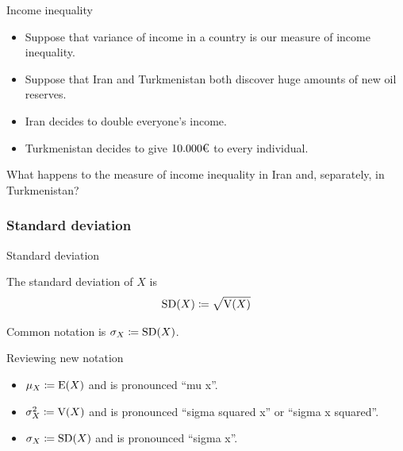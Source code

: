 \documentclass[english,notheorems]{beamer}\usepackage[]{graphicx}\usepackage[]{xcolor}
\newcommand{\omFinalAnswer}[1]{\textcolor<.>{orange} {#1}}
\theoremstyle{definition}
\theoremstyle{plain}
\theoremstyle{remark}
\begin{document}
\begin{frame}{Income inequality}
\begin{itemize}
\item Suppose that variance of income in a country is our measure of income
inequality.
\item Suppose that Iran and Turkmenistan both discover huge amounts of new
oil reserves.
\item Iran decides to double everyone's income.
\item Turkmenistan decides to give $\currency{10\thousandsSeparator000}$
to every individual.
\end{itemize}
\begin{omx}
What happens to the measure of income inequality in Iran and, separately,
in Turkmenistan?
\end{omx}
\end{frame}

\subsubsection{Standard deviation}
\begin{frame}{Standard deviation}
\begin{block}{}
The standard deviation of $X$ is
\[
\omSD(X)\omcoloneqq\sqrt{\omV(X)}
\]
\end{block}
\begin{block}{}
Common notation is $\sigma_{X}\omcoloneqq\omSD(X)$.
\end{block}
\end{frame}
\begin{frame}{Reviewing new notation}
\begin{itemize}
\item $\mu_{X}\omcoloneqq\omE(X)$ and is pronounced ``mu x''.
\item $\sigma^{2}_{X}\omcoloneqq\omV(X)$ and is pronounced ``sigma squared
x'' or ``sigma x squared''.
\item $\sigma_{X}\omcoloneqq\omSD(X)$ and is pronounced ``sigma x''.
\end{itemize}
\end{frame}
\end{document}
